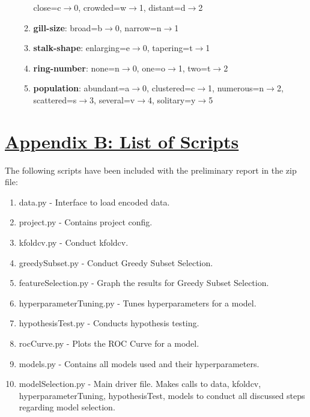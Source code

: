 \documentclass[fleqn]{article}
\begin{document}
\begin{enumerate}
\begin{enumerate}[label=\roman*.]
                close=c$\to$0,
                crowded=w$\to$1,
                distant=d$\to$2
            \item \textbf{gill-size}:
                broad=b$\to$0,
                narrow=n$\to$1
            \item \textbf{stalk-shape}:
                enlarging=e$\to$0,
                tapering=t$\to$1
            \item \textbf{ring-number}:
                none=n$\to$0,
                one=o$\to$1,
                two=t$\to$2
            \item \textbf{population}:
                abundant=a$\to$0,
                clustered=c$\to$1,
                numerous=n$\to$2,
                scattered=s$\to$3,
                several=v$\to$4,
                solitary=y$\to$5
        \end{enumerate}
    \end{enumerate}

    \newpage
    \section*{\underline{Appendix B: List of Scripts}}
    The following scripts have been included with the preliminary report in the zip file:
    \begin{enumerate}
        \item data.py - Interface to load encoded data.
        \item project.py - Contains project config.
        \item kfoldcv.py - Conduct kfoldcv.
        \item greedySubset.py - Conduct Greedy Subset Selection.
        \item featureSelection.py - Graph the results for Greedy Subset Selection.
        \item hyperparameterTuning.py - Tunes hyperparameters for a model.
        \item hypothesisTest.py - Conducts hypothesis testing.
        \item rocCurve.py - Plots the ROC Curve for a model.
        \item models.py - Contains all models used and their hyperparameters.
        \item modelSelection.py - Main driver file. Makes calls to data, kfoldcv,
        hyperparameterTuning, hypothesisTest, models to conduct all discussed steps
        regarding model selection.
    \end{enumerate}
\end{document}

